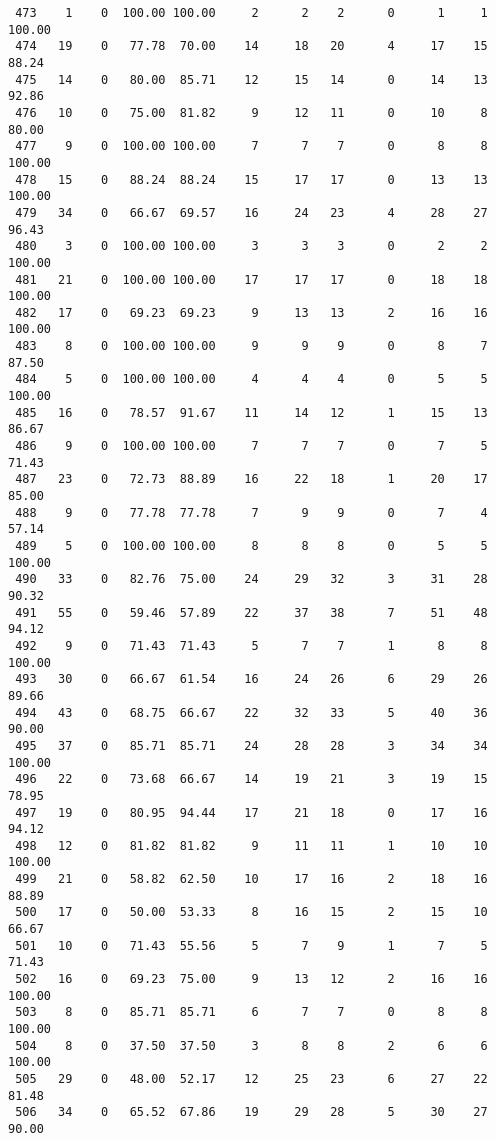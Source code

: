 \begin{verbatim}
 473    1    0  100.00 100.00     2      2    2      0      1     1   100.00
 474   19    0   77.78  70.00    14     18   20      4     17    15    88.24
 475   14    0   80.00  85.71    12     15   14      0     14    13    92.86
 476   10    0   75.00  81.82     9     12   11      0     10     8    80.00
 477    9    0  100.00 100.00     7      7    7      0      8     8   100.00
 478   15    0   88.24  88.24    15     17   17      0     13    13   100.00
 479   34    0   66.67  69.57    16     24   23      4     28    27    96.43
 480    3    0  100.00 100.00     3      3    3      0      2     2   100.00
 481   21    0  100.00 100.00    17     17   17      0     18    18   100.00
 482   17    0   69.23  69.23     9     13   13      2     16    16   100.00
 483    8    0  100.00 100.00     9      9    9      0      8     7    87.50
 484    5    0  100.00 100.00     4      4    4      0      5     5   100.00
 485   16    0   78.57  91.67    11     14   12      1     15    13    86.67
 486    9    0  100.00 100.00     7      7    7      0      7     5    71.43
 487   23    0   72.73  88.89    16     22   18      1     20    17    85.00
 488    9    0   77.78  77.78     7      9    9      0      7     4    57.14
 489    5    0  100.00 100.00     8      8    8      0      5     5   100.00
 490   33    0   82.76  75.00    24     29   32      3     31    28    90.32
 491   55    0   59.46  57.89    22     37   38      7     51    48    94.12
 492    9    0   71.43  71.43     5      7    7      1      8     8   100.00
 493   30    0   66.67  61.54    16     24   26      6     29    26    89.66
 494   43    0   68.75  66.67    22     32   33      5     40    36    90.00
 495   37    0   85.71  85.71    24     28   28      3     34    34   100.00
 496   22    0   73.68  66.67    14     19   21      3     19    15    78.95
 497   19    0   80.95  94.44    17     21   18      0     17    16    94.12
 498   12    0   81.82  81.82     9     11   11      1     10    10   100.00
 499   21    0   58.82  62.50    10     17   16      2     18    16    88.89
 500   17    0   50.00  53.33     8     16   15      2     15    10    66.67
 501   10    0   71.43  55.56     5      7    9      1      7     5    71.43
 502   16    0   69.23  75.00     9     13   12      2     16    16   100.00
 503    8    0   85.71  85.71     6      7    7      0      8     8   100.00
 504    8    0   37.50  37.50     3      8    8      2      6     6   100.00
 505   29    0   48.00  52.17    12     25   23      6     27    22    81.48
 506   34    0   65.52  67.86    19     29   28      5     30    27    90.00

\end{verbatim}
